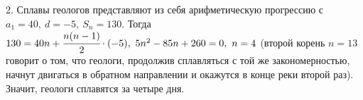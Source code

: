 2. Сплавы геологов представляют из себя арифметическую прогрессию с $a_1=40,\ d=-5,\ S_n=130.$ Тогда $130=40n+\cfrac{n(n-1)}{2}\cdot(-5),\
5n^2-85n+260=0,\ n=4$ (второй корень $n=13$ говорит о том, что геологи, продолжив сплавляться с той же закономерностью, начнут двигаться в обратном направлении и окажутся в конце реки второй раз). Значит, геологи сплавятся за четыре дня.\\
